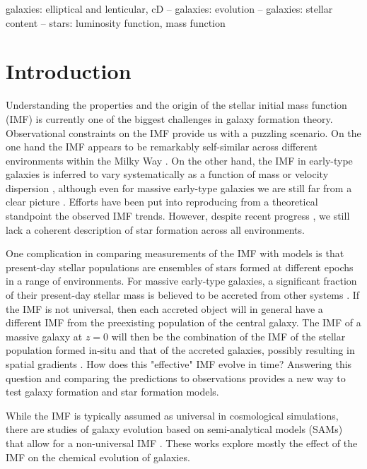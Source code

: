 \documentclass[usenatbib]{mnras}
\begin{document}
\begin{keywords}
   galaxies: elliptical and lenticular, cD -- galaxies: evolution -- galaxies: stellar content -- stars: luminosity function, mass function
\end{keywords}

\section{Introduction}\label{sect:intro}

Understanding the properties and the origin of the stellar
  initial mass function (IMF) is currently one of the biggest
  challenges in galaxy formation theory.  Observational constraints
on the IMF provide us with a puzzling scenario. On the one hand the
IMF appears to be remarkably self-similar across different
environments within the Milky Way \citep[see e.g.][]{BCM10, Off15}. On
the other hand, the IMF in early-type galaxies is inferred to vary
systematically as a function of mass or velocity dispersion
\citep{Tre++10,Cap++12,CvD12, Dut++12, TRN13, Spi++14, Pos++15},
although even for massive early-type galaxies we are still far from a
clear picture \citep{SLC15}.  Efforts have been put into reproducing
from a theoretical standpoint the observed IMF trends. However,
despite recent progress \citep{H+C11,Kru11,Hop12,GKH16}, we still lack a coherent description of
star formation across all environments.

One complication in comparing measurements of the IMF with models is
that present-day stellar populations are ensembles of stars formed at
different epochs in a range of environments.  For massive early-type
galaxies, a significant fraction of their present-day stellar mass is
believed to be accreted from other systems \citep[e.g.][]{vDo++10}.
If the IMF is not universal, then each accreted object will in general
have a different IMF from the preexisting population of the central
galaxy.  The IMF of a massive galaxy at $z=0$ will then be the
combination of the IMF of the stellar population formed in-situ and
that of the accreted galaxies, possibly resulting in spatial gradients
\citep{Mar++15, LaB++16}.  How does this "effective" IMF evolve in
time?  Answering this question and comparing the predictions to
observations provides a new way to test galaxy formation and star
formation models.

While the IMF is typically assumed as universal in cosmological
simulations, there are studies of galaxy evolution based on
semi-analytical models (SAMs) that allow for a non-universal IMF
\citep{Nag++05, Bek13, Cha++15, GargiuloI++15, Fon++16}. These works
explore mostly the effect of the IMF on the chemical evolution of
galaxies.  
\end{document}
